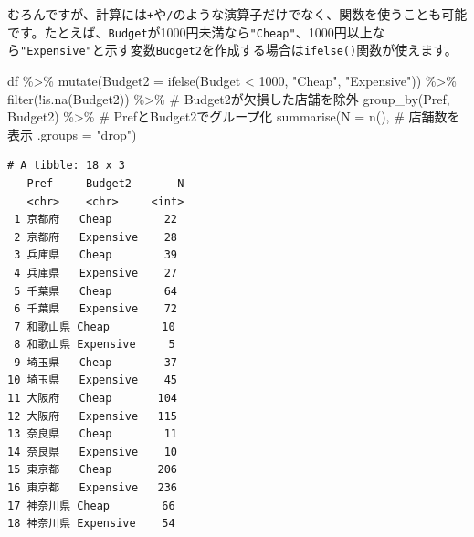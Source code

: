 \documentclass[
  a4paper,
  pandoc,
  ja=standard,
  jafont=haranoaji]{bxjsbook}
\newenvironment{Shaded}{\begin{snugshade}}{\end{snugshade}}
\newcommand{\AttributeTok}[1]{\textcolor[rgb]{0.00,0.48,0.65}{#1}}
\newcommand{\CommentTok}[1]{\textcolor[rgb]{0.37,0.37,0.37}{#1}}
\newcommand{\DecValTok}[1]{\textcolor[rgb]{0.68,0.00,0.00}{#1}}
\newcommand{\FunctionTok}[1]{\textcolor[rgb]{0.28,0.35,0.67}{#1}}
\newcommand{\NormalTok}[1]{\textcolor[rgb]{0.00,0.48,0.65}{#1}}
\newcommand{\OtherTok}[1]{\textcolor[rgb]{0.00,0.48,0.65}{#1}}
\newcommand{\SpecialCharTok}[1]{\textcolor[rgb]{0.37,0.37,0.37}{#1}}
\newcommand{\StringTok}[1]{\textcolor[rgb]{0.13,0.47,0.30}{#1}}
\begin{document}
\begin{Shaded}
\end{Shaded}

むろんですが、計算には\texttt{+}や\texttt{/}のような演算子だけでなく、関数を使うことも可能です。たとえば、\texttt{Budget}が1000円未満なら\texttt{"Cheap"}、1000円以上なら\texttt{"Expensive"}と示す変数\texttt{Budget2}を作成する場合は\texttt{ifelse()}関数が使えます。

\begin{Shaded}
\begin{Highlighting}[numbers=left,,]
\NormalTok{df }\SpecialCharTok{\%\textgreater{}\%} 
  \FunctionTok{mutate}\NormalTok{(}\AttributeTok{Budget2 =} \FunctionTok{ifelse}\NormalTok{(Budget }\SpecialCharTok{\textless{}} \DecValTok{1000}\NormalTok{, }\StringTok{"Cheap"}\NormalTok{, }\StringTok{"Expensive"}\NormalTok{)) }\SpecialCharTok{\%\textgreater{}\%}
  \FunctionTok{filter}\NormalTok{(}\SpecialCharTok{!}\FunctionTok{is.na}\NormalTok{(Budget2)) }\SpecialCharTok{\%\textgreater{}\%} \CommentTok{\# Budget2が欠損した店舗を除外}
  \FunctionTok{group\_by}\NormalTok{(Pref, Budget2) }\SpecialCharTok{\%\textgreater{}\%} \CommentTok{\# PrefとBudget2でグループ化}
  \FunctionTok{summarise}\NormalTok{(}\AttributeTok{N =} \FunctionTok{n}\NormalTok{(),          }\CommentTok{\# 店舗数を表示}
            \AttributeTok{.groups =} \StringTok{"drop"}\NormalTok{)}
\end{Highlighting}
\end{Shaded}

\begin{verbatim}
# A tibble: 18 x 3
   Pref     Budget2       N
   <chr>    <chr>     <int>
 1 京都府   Cheap        22
 2 京都府   Expensive    28
 3 兵庫県   Cheap        39
 4 兵庫県   Expensive    27
 5 千葉県   Cheap        64
 6 千葉県   Expensive    72
 7 和歌山県 Cheap        10
 8 和歌山県 Expensive     5
 9 埼玉県   Cheap        37
10 埼玉県   Expensive    45
11 大阪府   Cheap       104
12 大阪府   Expensive   115
13 奈良県   Cheap        11
14 奈良県   Expensive    10
15 東京都   Cheap       206
16 東京都   Expensive   236
17 神奈川県 Cheap        66
18 神奈川県 Expensive    54
\end{verbatim}
\end{document}
